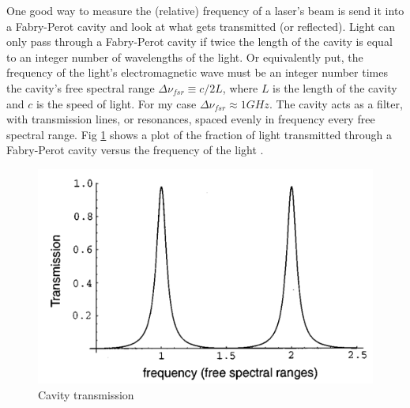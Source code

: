 \documentclass[12pt]{report}
\begin{document}
One good way to measure the (relative) frequency of a laser's beam is send it into a Fabry-Perot cavity and look at what gets transmitted (or reflected). Light can only pass through a Fabry-Perot cavity if twice the length of the cavity is equal to an integer number of wavelengths of the light. Or equivalently put, the frequency of the light's electromagnetic wave must be an integer number times the cavity's free spectral range $\Delta \nu_{fsr} \equiv c/2L$, where $L$ is the length of the cavity and $c$ is the speed of light. For my case $\Delta \nu_{fsr} \approx 1GHz$. The cavity acts as a filter, with transmission lines, or resonances, spaced evenly in frequency every free spectral range. Fig \ref{fig:cavityTransmission}  shows a plot of the fraction of light transmitted through a Fabry-Perot cavity versus the frequency of the light \cite{PDHintro}\cite{fundamentalsOfPhotonics}.

\begin{figure}[H]
    \centering
    \includegraphics[width=.8\textwidth]{cavityTransmission.png}
    \caption{Cavity transmission}
    \label{fig:cavityTransmission}
\end{figure}
\end{document}
